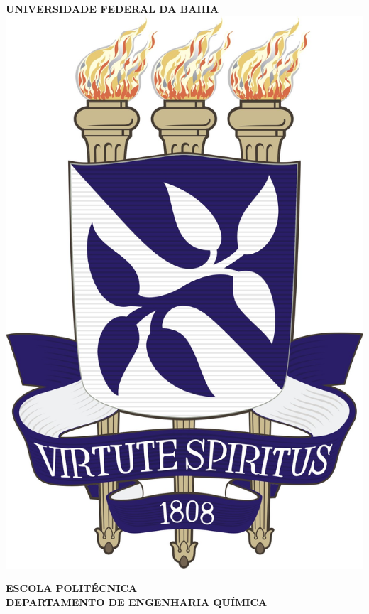 \documentclass[12pt, a4paper]{article}
\begin{document}
    \begin{titlepage}
        \centering
        
        
        
        \textbf{\large UNIVERSIDADE FEDERAL DA BAHIA} \\
        \vspace*{1.5cm}
        \includegraphics[width=1.0\textwidth, height=0.4\textheight, keepaspectratio]{brasao_ufba.jpg}



        \textbf{\large ESCOLA POLITÉCNICA} \\
        \textbf{\large DEPARTAMENTO DE ENGENHARIA QUÍMICA} \\
        

\end{titlepage}
\end{document}
